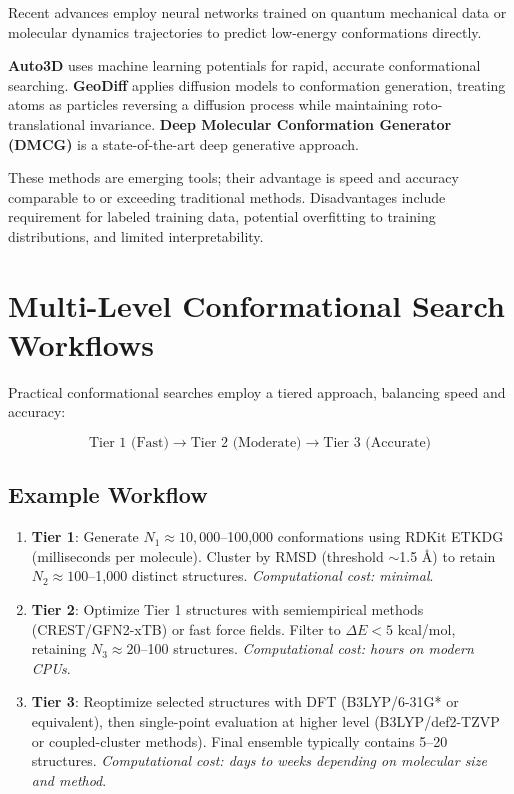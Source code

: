 \documentclass[12pt]{article}
\begin{document}
Recent advances employ neural networks trained on quantum mechanical data or molecular dynamics trajectories to predict low-energy conformations directly.

\textbf{Auto3D} uses machine learning potentials for rapid, accurate conformational searching. \textbf{GeoDiff} applies diffusion models to conformation generation, treating atoms as particles reversing a diffusion process while maintaining roto-translational invariance. \textbf{Deep Molecular Conformation Generator (DMCG)} is a state-of-the-art deep generative approach.

These methods are emerging tools; their advantage is speed and accuracy comparable to or exceeding traditional methods. Disadvantages include requirement for labeled training data, potential overfitting to training distributions, and limited interpretability.

\section{Multi-Level Conformational Search Workflows}

Practical conformational searches employ a tiered approach, balancing speed and accuracy:

\begin{equation}
\text{Tier 1 (Fast)} \rightarrow \text{Tier 2 (Moderate)} \rightarrow \text{Tier 3 (Accurate)}
\label{eq:multilevel_workflow}
\end{equation}

\subsection{Example Workflow}

\begin{enumerate}
\item \textbf{Tier 1}: Generate $N_1 \approx 10,000$--100,000 conformations using RDKit ETKDG (milliseconds per molecule). Cluster by RMSD (threshold $\sim$1.5 Å) to retain $N_2 \approx 100$--1,000 distinct structures. \textit{Computational cost: minimal}.

\item \textbf{Tier 2}: Optimize Tier 1 structures with semiempirical methods (CREST/GFN2-xTB) or fast force fields. Filter to $\Delta E < 5$ kcal/mol, retaining $N_3 \approx 20$--100 structures. \textit{Computational cost: hours on modern CPUs}.

\item \textbf{Tier 3}: Reoptimize selected structures with DFT (B3LYP/6-31G* or equivalent), then single-point evaluation at higher level (B3LYP/def2-TZVP or coupled-cluster methods). Final ensemble typically contains 5--20 structures. \textit{Computational cost: days to weeks depending on molecular size and method}.
\end{enumerate}
\end{document}

